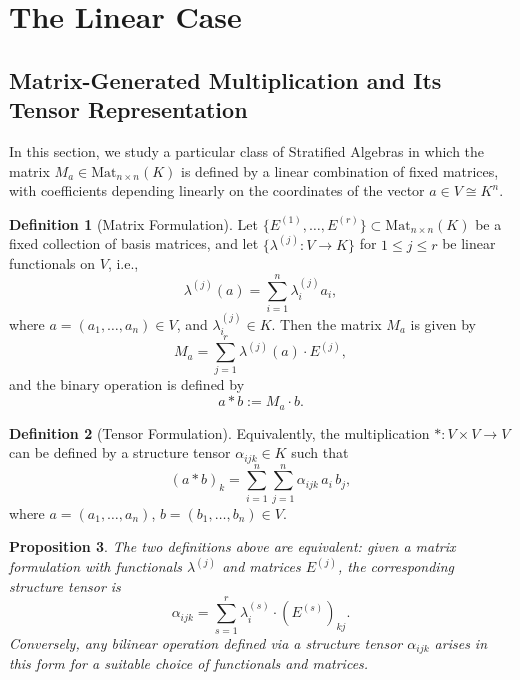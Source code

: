 \documentclass[12pt]{article}
\theoremstyle{definition}
\newtheorem{definition}{Definition}[section]
\theoremstyle{plain}
\newtheorem{proposition}[definition]{Proposition}
\theoremstyle{remark}
\begin{document}
\section{The Linear Case}

\subsection{Matrix-Generated Multiplication and Its Tensor Representation}

In this section, we study a particular class of Stratified Algebras in which the matrix \( M_a \in \mathrm{Mat}_{n \times n}(K) \) is defined by a linear combination of fixed matrices, with coefficients depending linearly on the coordinates of the vector \( a \in V \cong K^n \).

\begin{definition}[Matrix Formulation]
Let \( \{E^{(1)}, \dots, E^{(r)}\} \subset \mathrm{Mat}_{n \times n}(K) \) be a fixed collection of basis matrices, and let \( \{\lambda^{(j)} : V \to K \} \) for \( 1 \leq j \leq r \) be linear functionals on \( V \), i.e.,
\[
\lambda^{(j)}(a) = \sum_{i=1}^n \lambda^{(j)}_i a_i,
\]
where \( a = (a_1, \dots, a_n) \in V \), and \( \lambda^{(j)}_i \in K \). Then the matrix \( M_a \) is given by
\[
M_a = \sum_{j=1}^r \lambda^{(j)}(a) \cdot E^{(j)},
\]
and the binary operation is defined by
\[
a * b := M_a \cdot b.
\]
\end{definition}

\begin{definition}[Tensor Formulation]
Equivalently, the multiplication \( * : V \times V \to V \) can be defined by a structure tensor \( \alpha_{ijk} \in K \) such that
\[
(a * b)_k = \sum_{i=1}^n \sum_{j=1}^n \alpha_{ijk} \, a_i \, b_j,
\]
where \( a = (a_1, \dots, a_n) \), \( b = (b_1, \dots, b_n) \in V \).
\end{definition}

\begin{proposition}
The two definitions above are equivalent: given a matrix formulation with functionals \( \lambda^{(j)} \) and matrices \( E^{(j)} \), the corresponding structure tensor is
\[
\alpha_{ijk} = \sum_{s=1}^r \lambda^{(s)}_i \cdot (E^{(s)})_{kj}.
\]
Conversely, any bilinear operation defined via a structure tensor \( \alpha_{ijk} \) arises in this form for a suitable choice of functionals and matrices.
\end{proposition}
\end{document}
